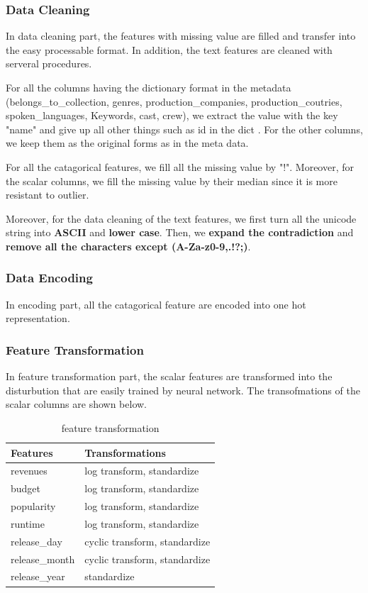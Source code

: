 \documentclass{article}
\begin{document}
\subsubsection{Data Cleaning}
	In data cleaning part, the features with missing value are filled and transfer into the easy processable format. In addition, the text features are cleaned with serveral procedures.
	
	For all the columns having the dictionary format in the metadata (belongs\_to\_collection, genres, production\_companies, production\_coutries, spoken\_languages, Keywords, cast, crew), we extract the value with the key "name" and give up all other things such as id in the dict . For the other columns, we keep them as the original forms as in the meta data.
	
	For all the catagorical features, we fill all the missing value by "!". Moreover, for the scalar columns, we fill the missing value by their median since it is more resistant to  outlier.
	
	Moreover, for the data cleaning of the text features, we first turn all the unicode string into \textbf{ASCII} and \textbf{lower case}. Then, we \textbf{expand the contradiction} and \textbf{remove all the characters except (A-Za-z0-9,.!?;)}.
	
\subsubsection{Data Encoding}
	In encoding part, all the catagorical feature are encoded into one hot representation.

\subsubsection{Feature Transformation}
In feature transformation part, the scalar features are transformed into the disturbution that are easily trained by neural network. The transofmations of the scalar columns are shown below.

\begin{table}[htb]
	\caption{feature transformation}
	\label{sample-table}
	\centering
	\begin{tabular}{ll}
		\toprule
		\cmidrule{1-2}
		Features &  Transformations \\
		\midrule
		revenues & log transform, standardize \\
		budget & log transform, standardize \\
		popularity & log transform, standardize \\
		runtime & log transform, standardize \\
		release\_day & cyclic transform, standardize \\
		release\_month & cyclic transform, standardize \\
		release\_year & standardize \\
	\end{tabular}
\end{table}
\end{document}
